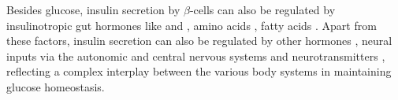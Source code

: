 
\par Besides glucose, insulin secretion by $\beta$-cells can also be regulated by insulinotropic gut hormones like  \textbf{\cite{meloni_glp-1_2013,carlessi_glp-1_2017,macdonald_multiple_2002}} and  \textbf{\cite{seino_gip_2010,christensen_glucose-dependent_2011,irwin_therapeutic_2009}}, amino acids \textbf{\cite{newsholme_amino_2006,newsholme_nutritional_2012}}, fatty acids \textbf{\cite{poitout_fatty_2018,cen_fatty_2016,jezek_fatty_2018,chueire_effect_2020}}. Apart from these factors, insulin secretion can also be regulated by other hormones \textbf{\cite{cheng_follicle-stimulating_2023}}, neural inputs via the autonomic \textbf{\cite{thorens_brain_2011, komatsu_glucosestimulated_2013}} and central nervous systems \textbf{\cite{ruud_neuronal_2017}} and neurotransmitters \textbf{\cite{rodriguez-diaz_neurotransmitters_2014}}, reflecting a complex interplay between the various body systems in maintaining glucose homeostasis. 



